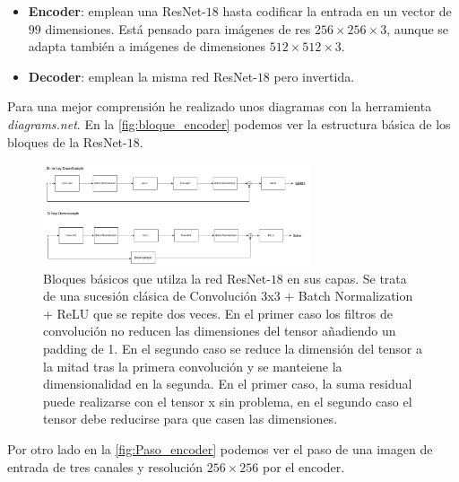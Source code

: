                 \begin{itemize}
                    \item \textbf{Encoder}: emplean una ResNet-$18$  hasta codificar la entrada en un vector de $99$ dimensiones. Está pensado para imágenes de res $256 \times 256 \times 3$, aunque se adapta también a imágenes de dimensiones $512 \times 512 \times 3$.
                    \item \textbf{Decoder}: emplean la misma red ResNet-$18$ pero invertida.
                \end{itemize}

                \noindent Para una mejor comprensión he realizado unos diagramas con la herramienta \textit{diagrams.net}. En la \autoref{fig:bloque_encoder} podemos ver la estructura básica de los bloques de la ResNet-$18$.

                \begin{figure}[!h]
                    \centering
                    \includegraphics[width=0.7\textwidth]{img/bloque_basico_encoder.png}
                    \caption{Bloques básicos que utilza la red ResNet-$18$ en sus capas. Se trata de una sucesión clásica de Convolución 3x3 + Batch Normalization + ReLU que se repite dos veces. En el primer caso los filtros de convolución no reducen las dimensiones del tensor añadiendo un padding de 1. En el segundo caso se reduce la dimensión del tensor a la mitad tras la primera convolución y se manteiene la dimensionalidad en la segunda. En el primer caso, la suma residual puede realizarse con el tensor x sin problema, en el segundo caso el tensor debe reducirse para que casen las dimensiones.}
                    \label{fig:bloque_encoder}
                \end{figure}

                \medskip 

                \noindent Por otro lado en la \autoref{fig:Paso_encoder} podemos ver el paso de una imagen de entrada de tres canales y resolución $256 \times 256$ por el encoder.

